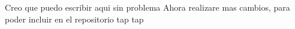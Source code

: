 Creo que puedo escribir aqui sin problema
Ahora realizare mas cambios, para poder incluir en el repositorio
tap
tap

